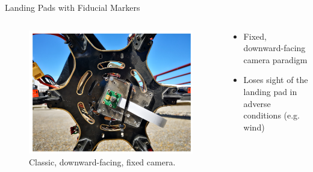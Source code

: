 \documentclass[aspectratio=169]{beamer}
\begin{document}
\begin{frame}{Landing Pads with Fiducial Markers}
\begin{columns}
	\begin{column}{0.5\textwidth}
		\begin{figure}
		\centering
		\includegraphics[width=\textwidth]{./images/wubben_drone}
		\caption{Classic, downward-facing, fixed camera.~\cite{accurate_landing_UAV_ground_pattern}}
		\label{figure:downward_facing_fixed_camera}
		\end{figure}
	\end{column}
	\begin{column}{0.5\textwidth}
	\begin{itemize}
		\item Fixed, downward-facing camera paradigm
		\item Loses sight of the landing pad in adverse conditions (e.g. wind)
	\end{itemize}
	\end{column}
\end{columns}
\end{frame}
\end{document}
